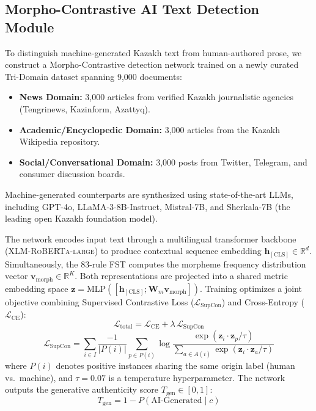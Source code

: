 \subsection{Morpho-Contrastive AI Text Detection Module}
To distinguish machine-generated Kazakh text from human-authored prose, we construct a Morpho-Contrastive detection network trained on a newly curated Tri-Domain dataset spanning 9,000 documents:
\begin{itemize}[leftmargin=*, nosep]
    \item \textbf{News Domain:} 3,000 articles from verified Kazakh journalistic agencies (Tengrinews, Kazinform, Azattyq).
    \item \textbf{Academic/Encyclopedic Domain:} 3,000 articles from the Kazakh Wikipedia repository.
    \item \textbf{Social/Conversational Domain:} 3,000 posts from Twitter, Telegram, and consumer discussion boards.
\end{itemize}
Machine-generated counterparts are synthesized using state-of-the-art LLMs, including GPT-4o, LLaMA-3-8B-Instruct, Mistral-7B, and Sherkala-7B (the leading open Kazakh foundation model).

The network encodes input text through a multilingual transformer backbone (\textsc{XLM-RoBERTa-large}) to produce contextual sequence embedding $\mathbf{h}_{[\text{CLS}]} \in \mathbb{R}^{d}$. Simultaneously, the 83-rule FST computes the morpheme frequency distribution vector $\mathbf{v}_{\text{morph}} \in \mathbb{R}^{K}$. Both representations are projected into a shared metric embedding space $\mathbf{z} = \text{MLP}([\mathbf{h}_{[\text{CLS}]}; \mathbf{W}_m \mathbf{v}_{\text{morph}}])$. Training optimizes a joint objective combining Supervised Contrastive Loss ($\mathcal{L}_{\text{SupCon}}$) \cite{khurana2023contrastive} and Cross-Entropy ($\mathcal{L}_{\text{CE}}$):
\begin{equation}
    \mathcal{L}_{\text{total}} = \mathcal{L}_{\text{CE}} + \lambda \, \mathcal{L}_{\text{SupCon}}
\end{equation}
\begin{equation}
    \mathcal{L}_{\text{SupCon}} = \sum_{i \in I} \frac{-1}{|P(i)|} \sum_{p \in P(i)} \log \frac{\exp(\mathbf{z}_i \cdot \mathbf{z}_p / \tau)}{\sum_{a \in A(i)} \exp(\mathbf{z}_i \cdot \mathbf{z}_a / \tau)}
\end{equation}
where $P(i)$ denotes positive instances sharing the same origin label (human vs.\ machine), and $\tau = 0.07$ is a temperature hyperparameter. The network outputs the generative authenticity score $T_{\text{gen}} \in [0, 1]$:
\begin{equation}
    T_{\text{gen}} = 1 - P(\text{AI-Generated} \mid c)
\end{equation}

